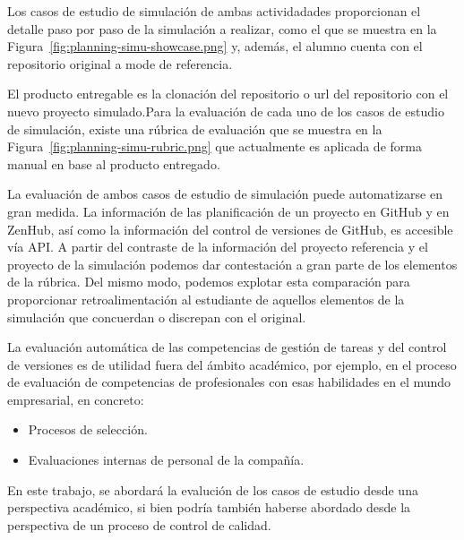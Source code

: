 Los casos de estudio de simulación de ambas actividadades proporcionan el  detalle paso por paso de la simulación a realizar, como el que se muestra en la Figura~\ref{fig:planning-simu-showcase.png} y, además, el alumno cuenta con el repositorio original a mode de referencia. 


El producto entregable es la clonación del repositorio o url del repositorio con el nuevo proyecto simulado.Para la evaluación de cada uno de los casos de estudio de simulación, existe una rúbrica de evaluación que se muestra en la  Figura~\ref{fig:planning-simu-rubric.png} que actualmente es aplicada de forma manual en base al producto entregado.


La evaluación de ambos casos de estudio de simulación puede automatizarse en gran medida. La información de las planificación de un proyecto en GitHub y en ZenHub, así como la información  del control de versiones de GitHub, es accesible vía API. A partir del contraste de la información del proyecto referencia y el proyecto de la simulación podemos dar contestación a gran parte de los elementos de la rúbrica. Del mismo modo, podemos explotar esta comparación para proporcionar retroalimentación al estudiante de aquellos elementos de la simulación que concuerdan o discrepan con el original.

La evaluación  automática de las competencias de  gestión de tareas y del control de versiones es de utilidad fuera del ámbito académico, por ejemplo, en el proceso de evaluación de competencias de profesionales con esas habilidades en el mundo empresarial, en concreto:

\begin{itemize}
	\item Procesos de selección.
	\item Evaluaciones internas de personal de la compañía.
\end{itemize}

En este trabajo, se abordará la evalución de los casos de estudio desde una perspectiva académico, si bien podría también haberse abordado desde la perspectiva de un proceso de control de calidad.